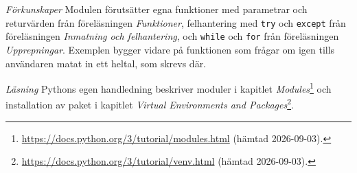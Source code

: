 \emph{Förkunskaper}
Modulen förutsätter egna funktioner med parametrar och returvärden från
föreläsningen \emph{Funktioner}, felhantering med
\texttt{try} och \texttt{except} från
föreläsningen \emph{Inmatning och felhantering}, och
\texttt{while} och
\texttt{for} från föreläsningen \emph{Upprepningar}.
Exemplen
bygger vidare på funktionen som frågar om igen tills användaren matat in
ett heltal, som skrevs där.

\emph{Läsning}
Pythons egen handledning beskriver moduler i kapitlet
\emph{Modules}\footnote{\label{fn:pydoc-modules}%
  \url{https://docs.python.org/3/tutorial/modules.html} (hämtad
  2026-09-03).} och installation av paket i kapitlet \emph{Virtual
Environments and Packages}\footnote{\label{fn:pydoc-venv}%
  \url{https://docs.python.org/3/tutorial/venv.html} (hämtad
  2026-09-03).}.
